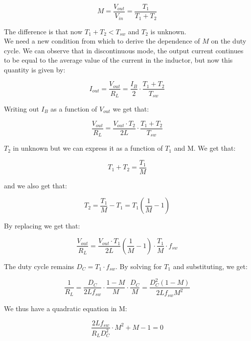 \documentclass[../main.tex]{subfiles}
\begin{document}
\begin{equation}
	M = \frac{V_{out}}{V_{in}} = \frac{T_1}{T_1 + T_2}
\end{equation}


The difference is that now $T_1 + T_2 < T_{sw}$ and $T_2$ is unknown.\\
We need a new condition from which to derive the dependence of $M$ on the duty cycle. We can observe that in discontinuous mode, the output current continues to be equal to the average value of the current in the inductor, but now this quantity is given by:

\begin{equation}
	I_{out} = \frac{V_{out}}{R_L} = \frac{I_B}{2} \cdot \frac{T_1 + T_2}{T_{sw}}	
\end{equation}

Writing out $I_B$ as a function of $V_{out}$ we get that:

\begin{equation}
	\frac{V_{out}}{R_L} = \frac{V_{out} \cdot T_2}{2L} \cdot \frac{T_1 + T_2}{T_{sw}}
\end{equation}

$T_2$ in unknown but we can express it as a function of $T_1$ and M. We get that:

\begin{equation}
	T_1 + T_2 = \frac{T_1}{M}
\end{equation}

and we also get that:

\begin{equation}
	T_2 = \frac{T_1}{M} - T_1 = T_1 \left( \frac{1}{M} - 1 \right)
\end{equation}


By replacing we get that:

\begin{equation}
	\frac{V_{out}}{R_L} = \frac{V_{out} \cdot T_1}{2L} \left( \frac{1}{M} - 1 \right) \cdot \frac{T_1}{M} \cdot f_{sw}
\end{equation}

The duty cycle remains $D_C = T_1 \cdot f_{sw}$. By solving for $T_1$ and substituting, we get:

\begin{equation}
	\frac{1}{R_L} = \frac{D_C}{2Lf_{sw}} \cdot \frac{1-M}{M} \cdot \frac{D_C}{M} = \frac{D^2_C(1-M)}{2Lf_{sw}M^2}
\end{equation}

We thus have a quadratic equation in M:

\begin{equation}
	\frac{2Lf_{sw}}{R_LD^2_C} \cdot M^2 + M - 1 = 0
\end{equation}
\end{document}
